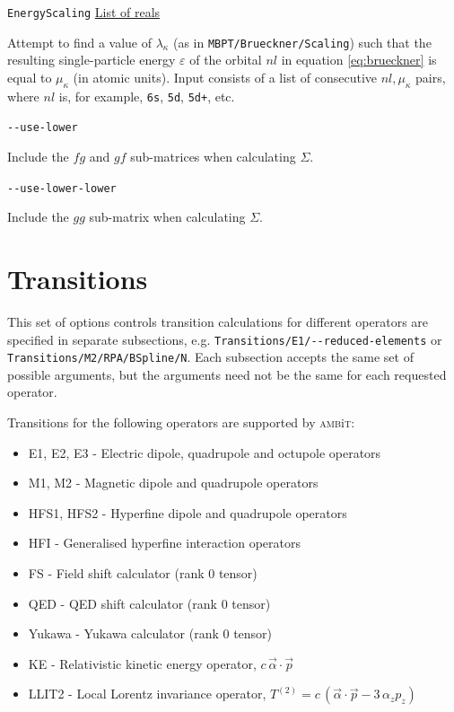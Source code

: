\documentclass{report}
\newcommand{\ambit}{\textsc{amb}{\footnotesize i}\textsc{t}}
\begin{document}
\texttt{EnergyScaling} \uline{List of reals}
\begin{adjustwidth}{1cm}{}
Attempt to find a value of $\lambda_{\kappa}$ (as in \texttt{MBPT/Brueckner/Scaling}) such that the resulting
single-particle energy $\varepsilon$ of the orbital $nl$ in equation \ref{eq:brueckner} is equal to $\mu_{\kappa}$ (in
atomic units). Input consists of a list of consecutive
$nl, \mu_{\kappa}$ pairs, where $nl$ is, for example, \texttt{6s}, \texttt{5d}, \texttt{5d+}, etc.
\end{adjustwidth}

\texttt{{-}{-}use-lower}
\begin{adjustwidth}{1cm}{}
Include the $fg$ and $gf$ sub-matrices when calculating $\Sigma$.
\end{adjustwidth}

\texttt{{-}{-}use-lower-lower}
\begin{adjustwidth}{1cm}{}
Include the $gg$ sub-matrix when calculating $\Sigma$.
\end{adjustwidth}

\section{Transitions}

This set of options controls transition calculations for different operators are specified in separate 
subsections, e.g. \texttt{Transitions/E1/{-}{-}reduced-elements} or 
\texttt{Transitions/M2/RPA/BSpline/N}. Each subsection accepts the same set 
of possible arguments, but the arguments need not be the same for each requested operator. 

Transitions for the following operators are supported by \ambit:

\begin{itemize}
\item E1, E2, E3 - Electric dipole, quadrupole and octupole operators
\item M1, M2 - Magnetic dipole and quadrupole operators
\item HFS1, HFS2 - Hyperfine dipole and quadrupole operators
\item HFI - Generalised hyperfine interaction operators
\item FS - Field shift calculator (rank 0 tensor)
\item QED - QED shift calculator (rank 0 tensor)
\item Yukawa - Yukawa calculator (rank 0 tensor)
\item KE - Relativistic kinetic energy operator, $c\,\vec{\alpha}\cdot\vec{p}$
\item LLIT2 - Local Lorentz invariance operator, $T^{(2)} = c\,(\vec{\alpha}\cdot\vec{p} - 3\,\alpha_z p_z)$
\end{itemize}
\end{document}
